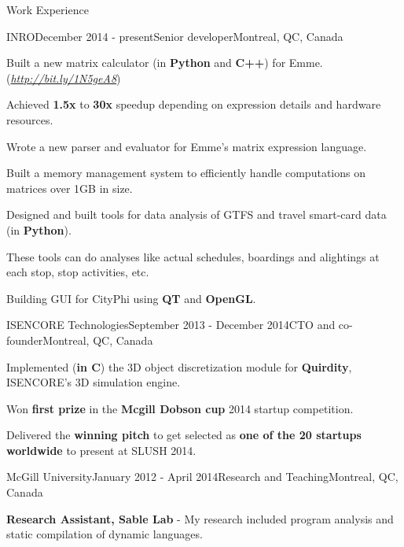 \documentclass{resume} %
\begin{document}
\begin{rSection}{Work Experience}

\begin{rSubsection}{INRO}{December 2014 - present}{Senior developer}{Montreal,
  QC, Canada}
\item Built a new matrix calculator (in \textbf{Python} and \textbf{C++}) for 
  Emme.(\href{http://bit.ly/1N5geA8}{\em{http://bit.ly/1N5geA8}})
\begin{lsubSubsection} 
\item Achieved \textbf{1.5x} to \textbf{30x} speedup depending on expression details and hardware
  resources.
\item Wrote a new parser and evaluator for Emme's matrix expression language.
\item Built a memory management system to efficiently handle computations on
  matrices over 1GB in size.
\end{lsubSubsection}
\item Designed and built tools for data analysis of GTFS and travel smart-card
  data (in \textbf{Python}). 
\begin{lsubSubsection} 
\item These tools can do analyses like actual schedules, boardings and
  alightings at each stop, stop activities, etc.
\end{lsubSubsection}
\item Building GUI for CityPhi using \textbf{QT} and \textbf{OpenGL}.
\end{rSubsection}

\begin{rSubsection}{ISENCORE Technologies}{September 2013 - December 2014}{CTO
  and co-founder}{Montreal, QC, Canada}
\item Implemented (\textbf{in C}) the 3D object discretization module for \textbf{Quirdity},
  ISENCORE's 3D simulation engine.
\item Won \textbf{first prize} in the \textbf{Mcgill Dobson cup} 2014 startup competition. 
\item Delivered the \textbf{winning pitch} to get selected as \textbf{one of the 20 startups
  worldwide} to present at SLUSH 2014.
\end{rSubsection}

\begin{rSubsection}{McGill University}{January 2012 - April 2014}{Research and
Teaching}{Montreal, QC, Canada} 
\item \textbf{Research Assistant, Sable Lab} - My research included program
analysis and static compilation of dynamic languages.


\end{rSubsection}
\end{rSection}
\end{document}

